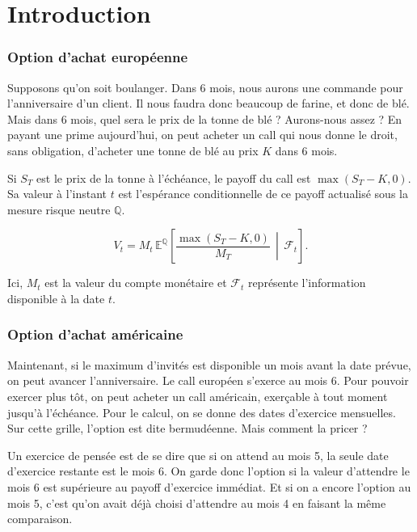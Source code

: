 \documentclass[11pt,a4paper]{article}
\begin{document}
\color{Ink}
\setlength{\abovedisplayskip}{8pt plus 2pt minus 2pt}
\setlength{\belowdisplayskip}{8pt plus 2pt minus 2pt}

\part{Introduction}




\section{Option d'achat européenne}

Supposons qu'on soit boulanger. Dans 6 mois, nous aurons une commande pour l'anniversaire d'un client. Il nous faudra donc beaucoup de farine, et donc de blé. Mais dans 6 mois, quel sera le prix de la tonne de blé ? Aurons-nous assez ? En payant une prime aujourd'hui, on peut acheter un call qui nous donne le droit, sans obligation, d'acheter une tonne de blé au prix $K$ dans 6 mois.

Si $S_T$ est le prix de la tonne à l'échéance, le payoff du call est $\max(S_T-K,0)$. Sa valeur à l'instant $t$ est l'espérance conditionnelle de ce payoff actualisé sous la mesure risque neutre $\mathbb{Q}$.

$$
V_t=M_t\,\mathbb{E}^{\mathbb{Q}}\left[\frac{\max(S_T-K,0)}{M_T}\,\middle|\,\mathcal{F}_t\right].
$$

Ici, $M_t$ est la valeur du compte monétaire et $\mathcal{F}_t$ représente l'information disponible à la date $t$.

\section{Option d'achat américaine}

Maintenant, si le maximum d'invités est disponible un mois avant la date prévue, on peut avancer l'anniversaire. Le call européen s'exerce au mois 6. Pour pouvoir exercer plus tôt, on peut acheter un call américain, exerçable à tout moment jusqu'à l'échéance. Pour le calcul, on se donne des dates d'exercice mensuelles. Sur cette grille, l'option est dite bermudéenne. Mais comment la pricer ?

\bigskip

Un exercice de pensée est de se dire que si on attend au mois 5, la seule date d'exercice restante est le mois 6. On garde donc l'option si la valeur d'attendre le mois 6 est supérieure au payoff d'exercice immédiat. Et si on a encore l'option au mois 5, c'est qu'on avait déjà choisi d'attendre au mois 4 en faisant la même comparaison.
\end{document}
